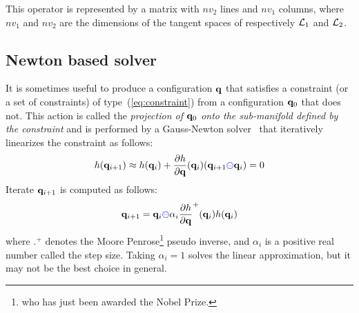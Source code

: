 This operator is represented by a matrix with $nv_2$ lines and $nv_1$ columns, where $nv_1$ and $nv_2$ are the dimensions of the tangent spaces of respectively $\mathcal{L}_1$ and $\mathcal{L}_2$.

\subsection{Newton based solver}

It is sometimes useful to produce a configuration $\mathbf{q}$ that satisfies a constraint (or a set of constraints) of type~(\ref{eq:constraint}) from a configuration $\mathbf{q}_0$ that does not. This action is called the \textit{projection of $\mathbf{q}_0$ onto the sub-manifold defined by the constraint} and is performed by a Gauss-Newton solver~\cite[Chapter~10]{NoceWrig06} that iteratively linearizes the constraint as follows:
$$
h(\mathbf{q}_{i+1}) \approx h(\mathbf{q}_i) + \frac{\partial h}{\partial \mathbf{q}}(\mathbf{q}_{i})(\mathbf{q}_{i+1}{\color{blue}\ominus}\mathbf{q}_i) = 0
$$
Iterate $\mathbf{q}_{i+1}$ is computed as follows:
\begin{equation}\label{eq:HierarchicalIterative}
\conf_{i+1} = \conf_i{\color{blue}\ominus}\alpha_i\frac{\partial h}{\partial \conf}^{+}(\conf_{i}) h(\conf_i)
\end{equation}
where $.^{+}$ denotes the Moore Penrose\footnote{who has just been awarded the Nobel Prize.} pseudo inverse, and $\alpha_i$ is a positive real number called the step size. Taking $\alpha_i=1$ solves the linear approximation, but it may not be the best choice in general.

